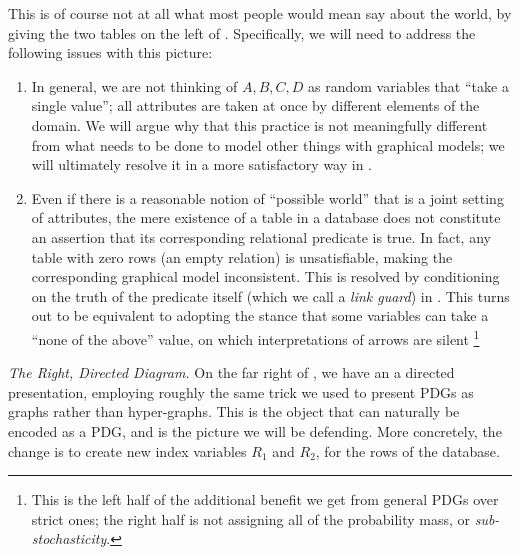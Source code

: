\documentclass{article}
\theoremstyle{definition}
\theoremstyle{remark}
\begin{document}
\begin{example}
    This is of course not at all what most people would mean say about the world, by giving the two tables on the left of . Specifically, we will need to address the following issues with this picture:
    \begin{enumerate}
        \item  In general, we are not thinking of  $A, B, C, D$ as random variables that ``take a single value''; all attributes are taken at once by different elements of the domain. We will argue why that this practice is not meaningfully different from what needs to be done to model other things with graphical models; we will ultimately resolve it in a more satisfactory way in .
        \item Even if there is a reasonable notion of ``possible world'' that is a joint setting of attributes, the mere existence of a table in a database does not constitute an assertion that its corresponding relational predicate is true. In fact, any table with zero rows (an empty relation) is unsatisfiable, making the corresponding graphical model inconsistent. This is resolved by conditioning on the truth of the predicate itself (which we call a \emph{link guard}) in . This turns out to be equivalent to adopting the stance that some variables can take a ``none of the above'' value, on which interpretations of arrows are silent%
            \footnote{This is the left half of the additional benefit we get from general PDGs over strict ones; the right half is not assigning all of the probability mass, or \emph{sub-stochasticity}. }
    \end{enumerate}

    

    

    
    \textit{The Right, Directed Diagram.} On the far right of , we have an a directed presentation, employing roughly the same trick we used to present PDGs as graphs rather than hyper-graphs. This is the object that can naturally be encoded as a PDG, and is the picture we will be defending. More concretely, the change is to create new index variables $R_1$ and $R_2$, for the rows of the database. 
    

\end{example}
\end{document}
